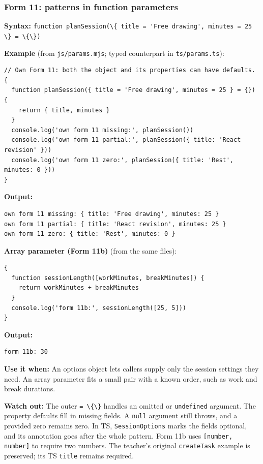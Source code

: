 \documentclass[
  11pt,
]{article}
\newcommand{\passthrough}[1]{#1}
\begin{document}
\subsubsection{Form 11: patterns in function
parameters}\label{form-11-patterns-in-function-parameters}

\textbf{Syntax:}
\passthrough{\lstinline!function planSession(\{ title = 'Free drawing', minutes = 25 \} = \{\})!}

\textbf{Example} (from \passthrough{\lstinline!js/params.mjs!}; typed
counterpart in \passthrough{\lstinline!ts/params.ts!}):

\begin{lstlisting}
// Own Form 11: both the object and its properties can have defaults.
{
  function planSession({ title = 'Free drawing', minutes = 25 } = {}) {
    return { title, minutes }
  }
  console.log('own form 11 missing:', planSession())
  console.log('own form 11 partial:', planSession({ title: 'React revision' }))
  console.log('own form 11 zero:', planSession({ title: 'Rest', minutes: 0 }))
}
\end{lstlisting}

\textbf{Output:}

\begin{lstlisting}
own form 11 missing: { title: 'Free drawing', minutes: 25 }
own form 11 partial: { title: 'React revision', minutes: 25 }
own form 11 zero: { title: 'Rest', minutes: 0 }
\end{lstlisting}

\textbf{Array parameter (Form 11b)} (from the same files):

\begin{lstlisting}
{
  function sessionLength([workMinutes, breakMinutes]) {
    return workMinutes + breakMinutes
  }
  console.log('form 11b:', sessionLength([25, 5]))
}
\end{lstlisting}

\textbf{Output:}

\begin{lstlisting}
form 11b: 30
\end{lstlisting}

\textbf{Use it when:} An options object lets callers supply only the
session settings they need. An array parameter fits a small pair with a
known order, such as work and break durations.

\textbf{Watch out:} The outer \passthrough{\lstinline!= \{\}!} handles
an omitted or \passthrough{\lstinline!undefined!} argument. The property
defaults fill in missing fields. A \passthrough{\lstinline!null!}
argument still throws, and a provided zero remains zero. In TS,
\passthrough{\lstinline!SessionOptions!} marks the fields optional, and
its annotation goes after the whole pattern. Form 11b uses
\passthrough{\lstinline![number, number]!} to require two numbers. The
teacher's original \passthrough{\lstinline!createTask!} example is
preserved; its TS \passthrough{\lstinline!title!} remains required.
\end{document}
